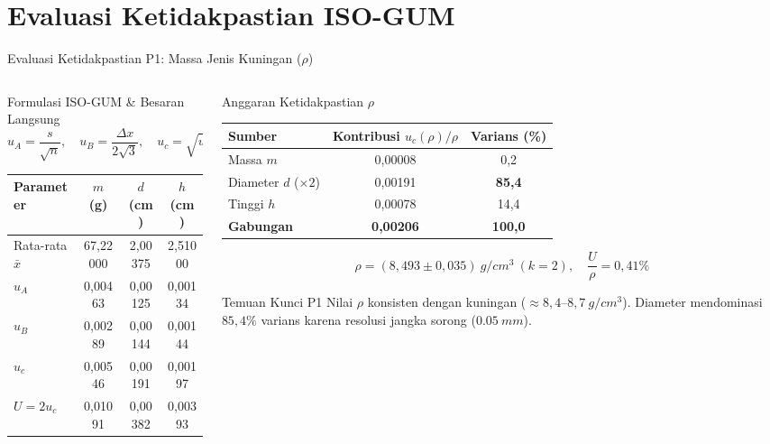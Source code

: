 \documentclass[aspectratio=169,10pt]{beamer}
\newcommand{\sm}{\fontsize{8.2}{10.2}\selectfont}
\newcommand{\xs}{\fontsize{7.1}{9}\selectfont}
\newcommand{\uc}{u_{c}}
\newcommand{\uA}{u_{A}}
\newcommand{\uB}{u_{B}}
\begin{document}
\section{Evaluasi Ketidakpastian ISO-GUM}

\begin{frame}{Evaluasi Ketidakpastian P1: Massa Jenis Kuningan ($\rho$)}
\begin{columns}[T,onlytextwidth]
\begin{column}{.49\textwidth}
\begin{block}{Formulasi ISO-GUM \& Besaran Langsung}\xs
$$\uA = \frac{s}{\sqrt{n}}, \quad \uB = \frac{\Delta x}{2\sqrt{3}}, \quad \uc = \sqrt{\uA^2+\uB^2}, \quad U = 2\uc$$
\centering
\setlength{\tabcolsep}{3.5pt}\begin{tabular}{@{}lccc@{}}
\toprule
\textbf{Parameter} & $m$ (g) & $d$ (cm) & $h$ (cm)\\
\midrule
Rata-rata $\bar{x}$ & 67,22000 & 2,00375 & 2,51000\\
$\uA$ & 0,00463 & 0,00125 & 0,00134\\
$\uB$ & 0,00289 & 0,00144 & 0,00144\\
$\uc$ & 0,00546 & 0,00191 & 0,00197\\
$U = 2\uc$ & 0,01091 & 0,00382 & 0,00393\\
\bottomrule
\end{tabular}
\end{block}
\end{column}

\begin{column}{.49\textwidth}
\begin{exampleblock}{Anggaran Ketidakpastian $\rho$}\xs
\centering
\begin{tabular}{@{}lcc@{}}
\toprule
\textbf{Sumber} & \textbf{Kontribusi $\uc(\rho)/\rho$} & \textbf{Varians (\%)}\\
\midrule
Massa $m$ & 0,00008 & 0,2\\
Diameter $d$ ($\times 2$) & 0,00191 & \textbf{85,4}\\
Tinggi $h$ & 0,00078 & 14,4\\
\midrule
\textbf{Gabungan} & \textbf{0,00206} & \textbf{100,0}\\
\bottomrule
\end{tabular}
\par\vspace{2mm}\sm
$$\boxed{\rho = (8{,}493 \pm 0{,}035)\ \si{g/cm^3}\ (k=2), \quad \frac{U}{\rho}=0{,}41\%}$$
\end{exampleblock}
\begin{alertblock}{Temuan Kunci P1}\xs
Nilai $\rho$ konsisten dengan kuningan ($\approx 8{,}4\text{--}8{,}7\ \si{g/cm^3}$). Diameter mendominasi $85{,}4\%$ varians karena resolusi jangka sorong ($\SI{0,05}{mm}$).
\end{alertblock}
\end{column}
\end{columns}
\end{frame}
\end{document}
